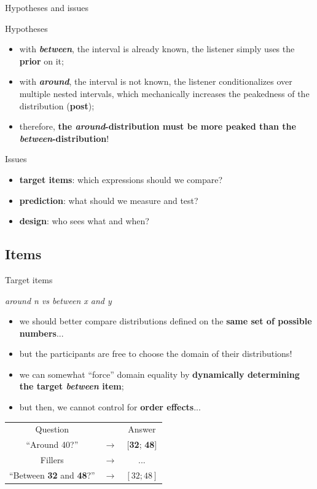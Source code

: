 \documentclass[xcolor=table, hyperref={pdfpagelabels=false}]{beamer}
\begin{document}
\begin{frame}{Hypotheses and issues}
\begin{block}{Hypotheses}
	\begin{itemize}
		\item with \textit{\textbf{between}}, the interval is already known, the listener simply uses the \textbf{prior} on it; \pause
		\item with \textit{\textbf{around}}, the interval is not known, the listener conditionalizes over multiple nested intervals, which mechanically increases the peakedness of the distribution (\textbf{post}); \pause
		\item therefore, \textbf{the \textit{around}-distribution must be more peaked than the \textit{between}-distribution}!
	\end{itemize}
\end{block}\pause
\begin{alertblock}{Issues}
	\begin{itemize}
		\item \textbf{target items}: which expressions should we compare? \pause
		\item \textbf{prediction}: what should we measure and test? \pause
		\item \textbf{design}: who sees what and when?
	\end{itemize}
\end{alertblock}
\end{frame}
\subsection{Items}
\begin{frame}{Target items}
\begin{block}{\textit{around n vs between x and y}}
	\begin{itemize}
		\item we should better compare distributions defined on the \textbf{same set of possible numbers}...\pause
		\item but the participants are free to choose the domain of their distributions! \pause
		\item we can somewhat ``force'' domain equality by \textbf{dynamically determining the target \textit{between} item}; \pause
		\item but then, we cannot control for \textbf{order effects}...
	\end{itemize}
\end{block}
\begin{table}
	\centering
	\begin{tabular}{ccc}
	Question && Answer \\
	``Around 40?'' &$\rightarrow$ & $[$\textbf{32}; \textbf{48}$]$ \\
	Fillers &$\rightarrow$ & ... \\
	``Between \textbf{32} and \textbf{48}?'' &$\rightarrow$& $[32;48]$
\end{tabular}
\end{table}
\end{frame}
\end{document}
